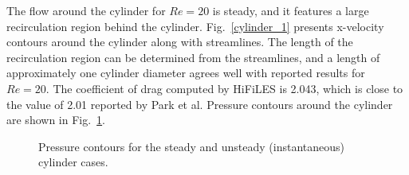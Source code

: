 The flow around the cylinder for $Re = 20$ is steady, and it features a large recirculation region behind the cylinder. Fig.~\ref{cylinder_1} presents x-velocity contours around the cylinder along with streamlines. The length of the recirculation region can be determined from the streamlines, and a length of approximately one cylinder diameter agrees well with reported results for $Re = 20$. The coefficient of drag computed by HiFiLES is 2.043, which is close to the value of 2.01 reported by Park et al. Pressure contours around the cylinder are shown in Fig.~\ref{cylinder_2}.

\begin{figure}
  \begin{subfigmatrix}{2}
  \end{subfigmatrix}
  \caption{Pressure contours for the steady and unsteady (instantaneous) cylinder cases.}
  \label{cylinder_2}
\end{figure}

